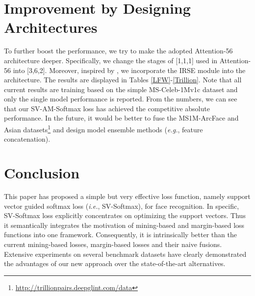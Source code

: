\documentclass[10pt,twocolumn,letterpaper]{article}
\begin{document}
\section{Improvement by Designing Architectures}

To further boost the performance, we try to make the adopted Attention-56 \cite{Attention56} architecture deeper. Specifically, we change the stages of [1,1,1] used in Attention-56 into [3,6,2]. Moreover, inspired by \cite{Arc-Softmax}, we incorporate the IRSE module into the architecture. The results are displayed in Tables \ref{LFW}-\ref{Trillion}. Note that all current results are training based on the simple MS-Celeb-1Mv1c dataset and only the single model performance is reported. From the numbers, we can see that our SV-AM-Softmax loss has achieved the competitive absolute performance. In the future, it would be better to fuse the MS1M-ArcFace \cite{Arc-Softmax} and Asian datasets\footnote{\url{http://trillionpairs.deepglint.com/data}} and design model ensemble methods (\textit{e.g.}, feature concatenation).



\section{Conclusion}
This paper has proposed a simple but very effective loss function, namely support vector guided softmax loss (\textit{i.e.}, SV-Softmax), for face recognition. In specific, SV-Softmax loss explicitly concentrates on optimizing the support vectors. Thus it semantically integrates the motivation of mining-based and margin-based loss functions into one framework. Consequently, it is intrinsically better than the current mining-based losses, margin-based losses and their naive fusions. Extensive experiments on several benchmark datasets have clearly demonstrated the advantages of our new approach over the state-of-the-art alternatives.









{\small


}
\end{document}
